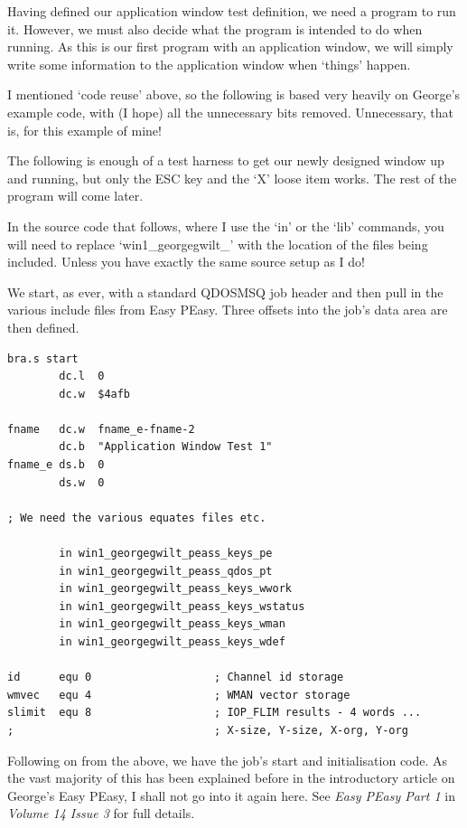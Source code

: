 Having defined our application window test definition, we need a
    program to run it. However, we must also decide what the program is
    intended to do when running. As this is our first program with an
    application window, we will simply write some information to the
    application window when `things' happen.

I mentioned `code reuse' above, so the following is based very
    heavily on George's example code, with (I hope) all the unnecessary bits
    removed. Unnecessary, that is, for this example of mine!

The following is enough of a test harness to get our newly designed
    window up and running, but only the ESC key and the `X' loose item works.
    The rest of the program will come later.

In the source code that follows, where I use the `in' or the `lib'
    commands, you will need to replace `win1\_georgegwilt\_' with the location
    of the files being included. Unless you have exactly the same source setup
    as I do!

We start, as ever, with a standard QDOSMSQ job header and then pull
    in the various include files from Easy PEasy. Three offsets into the job's
    data area are then defined.

\begin{lstlisting}[firstnumber=1,caption={ApplTest\_asm - Standard Job Header \& Equates}]
        bra.s start
        dc.l  0
        dc.w  $4afb

fname   dc.w  fname_e-fname-2
        dc.b  "Application Window Test 1"
fname_e ds.b  0
        ds.w  0

; We need the various equates files etc.

        in win1_georgegwilt_peass_keys_pe
        in win1_georgegwilt_peass_qdos_pt
        in win1_georgegwilt_peass_keys_wwork
        in win1_georgegwilt_peass_keys_wstatus
        in win1_georgegwilt_peass_keys_wman
        in win1_georgegwilt_peass_keys_wdef

id      equ 0                   ; Channel id storage
wmvec   equ 4                   ; WMAN vector storage
slimit  equ 8                   ; IOP_FLIM results - 4 words ...
;                               ; X-size, Y-size, X-org, Y-org
\end{lstlisting}

Following on from the above, we have the job's start and
    initialisation code. As the vast majority of this has been explained
    before in the introductory article on George's Easy
    PEasy, I shall not go into it again here. See \emph{Easy
    PEasy Part 1} in \emph{Volume 14 Issue 3} for full
    details.

